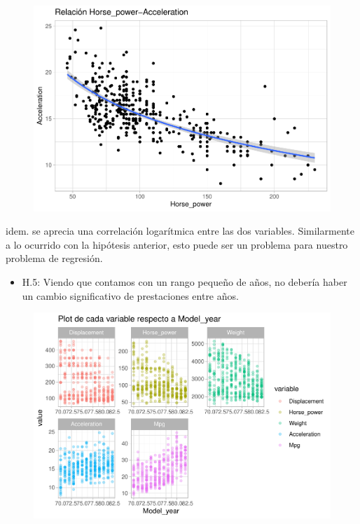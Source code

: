 \begin{figure}[H]\includegraphics[width=.9\linewidth]{img/EDA_files/figure-latex/unnamed-chunk-28-1} \caption{}\end{figure}

idem. se aprecia una correlación logarítmica entre las dos variables. Similarmente a lo ocurrido con la hipótesis anterior, esto puede ser un problema para nuestro problema de regresión.

\begin{itemize}
\item H.5: Viendo que contamos con un rango pequeño de años, no debería haber un cambio significativo de prestaciones entre años.
\end{itemize}

\begin{figure}[H]\includegraphics[width=.9\linewidth]{img/EDA_files/figure-latex/unnamed-chunk-29-1} \caption{}\end{figure}

